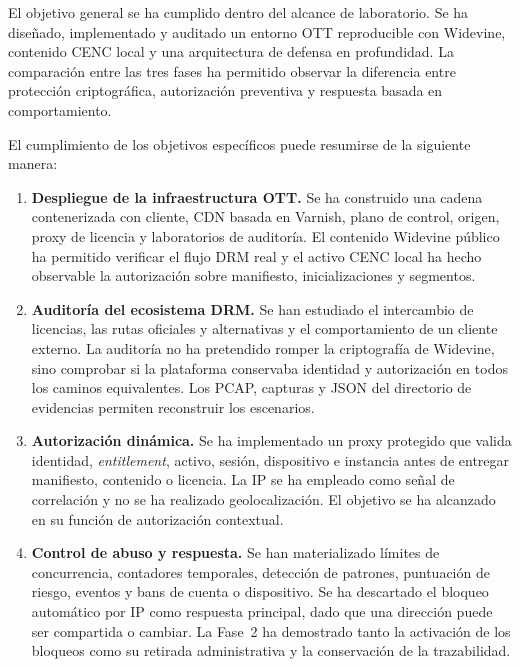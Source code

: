 El objetivo general se ha cumplido dentro del alcance de laboratorio. Se ha diseñado, implementado y auditado un entorno OTT reproducible con Widevine, contenido CENC local y una arquitectura de defensa en profundidad. La comparación entre las tres fases ha permitido observar la diferencia entre protección criptográfica, autorización preventiva y respuesta basada en comportamiento.

El cumplimiento de los objetivos específicos puede resumirse de la siguiente manera:

\begin{enumerate}
    \item \textbf{Despliegue de la infraestructura OTT.} Se ha construido una cadena contenerizada con cliente, CDN basada en Varnish, plano de control, origen, proxy de licencia y laboratorios de auditoría. El contenido Widevine público ha permitido verificar el flujo DRM real y el activo CENC local ha hecho observable la autorización sobre manifiesto, inicializaciones y segmentos.

    \item \textbf{Auditoría del ecosistema DRM.} Se han estudiado el intercambio de licencias, las rutas oficiales y alternativas y el comportamiento de un cliente externo. La auditoría no ha pretendido romper la criptografía de Widevine, sino comprobar si la plataforma conservaba identidad y autorización en todos los caminos equivalentes. Los PCAP, capturas y JSON del directorio de evidencias permiten reconstruir los escenarios.

    \item \textbf{Autorización dinámica.} Se ha implementado un proxy protegido que valida identidad, \textit{entitlement}, activo, sesión, dispositivo e instancia antes de entregar manifiesto, contenido o licencia. La IP se ha empleado como señal de correlación y no se ha realizado geolocalización. El objetivo se ha alcanzado en su función de autorización contextual.

    \item \textbf{Control de abuso y respuesta.} Se han materializado límites de concurrencia, contadores temporales, detección de patrones, puntuación de riesgo, eventos y bans de cuenta o dispositivo. Se ha descartado el bloqueo automático por IP como respuesta principal, dado que una dirección puede ser compartida o cambiar. La Fase~2 ha demostrado tanto la activación de los bloqueos como su retirada administrativa y la conservación de la trazabilidad.
\end{enumerate}

